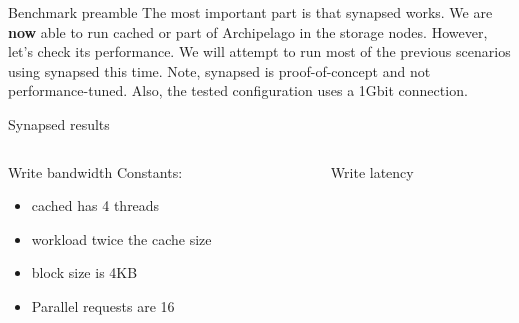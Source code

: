 \begin{frame}{Benchmark preamble}
	The most important part is that synapsed works. We are \textbf{now} able to
	run cached or part of Archipelago in the storage nodes.
	\dspc
	However, let's check its performance.
	\spc
	We will attempt to run most of the previous scenarios using synapsed this 
	time.
	\dspc
	Note, synapsed is proof-of-concept and not performance-tuned. Also, the 
	tested configuration uses a 1Gbit connection.
\end{frame}

\begin{frame}{Synapsed results}
	\begin{columns}[t]
		\begin{column}{.5\textwidth}
			Write bandwidth
			Constants:
			\begin{itemize}
				\item cached has 4 threads
				\item workload twice the cache size
				\item block size is 4KB
				\item Parallel requests are 16
			\end{itemize}
		\end{column}
		\begin{column}{.5\textwidth}
			Write latency
\end{column}
\end{columns}
\end{frame}
